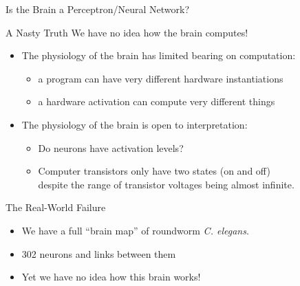 \documentclass[xcolor={usenames,svgnames,x11names,dvipsnames,table}]{beamer}
\begin{document}
\begin{frame}{Is the Brain a Perceptron\slash Neural Network?}
    \begin{alertblock}{A Nasty Truth}
        We have no idea how the brain computes!
    \end{alertblock}

    \begin{itemize}
        \item The physiology of the brain has limited bearing on computation:
            \begin{itemize}
                \item a program can have very different hardware instantiations
                \item a hardware activation can compute very different things
            \end{itemize}
        \item The physiology of the brain is open to interpretation:
            \begin{itemize}
                \item Do neurons have activation levels?
                \item Computer transistors only have two states (on and off)\\
                    despite the range of transistor voltages being almost infinite.
            \end{itemize}
    \end{itemize}

    \pause
    \begin{block}{The Real-World Failure}
        \begin{itemize}
            \item We have a full ``brain map'' of roundworm \emph{C. elegans}.
            \item 302 neurons and links between them
            \item Yet we have no idea how this brain works!
        \end{itemize}
    \end{block}
\end{frame}
\end{document}
